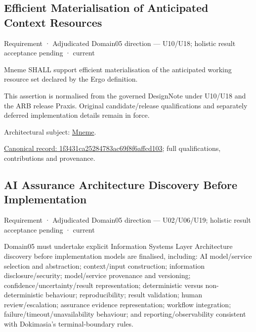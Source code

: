 \subsection{Efficient Materialisation of Anticipated Context Resources}

\label{element:1f3431ca25284783ac69f8f6affcd103}
{\small Requirement · Adjudicated Domain05 direction — U10/U18; holistic result acceptance pending · current}\par

Mneme SHALL support efficient materialisation of the anticipated working resource set declared by the Ergo definition.



This assertion is normalised from the governed DesignNote under U10/U18 and the ARB release Praxis. Original candidate/release qualifications and separately deferred implementation details remain in force.



Architectural subject: \hyperref[element:1af8a56358f7429fabfb57be66542a99]{Mneme}.


{\footnotesize \href{../../../../continuum/motivation/requirement/1f3431ca25284783ac69f8f6affcd103.md}{Canonical record: 1f3431ca25284783ac69f8f6affcd103}; full qualifications, contributions and provenance.}\par
\subsection{AI Assurance Architecture Discovery Before Implementation}

\label{element:24a609117a4f40839f8b669ebf720cde}
{\small Requirement · Adjudicated Domain05 direction — U02/U06/U19; holistic result acceptance pending · current}\par

Domain05 must undertake explicit Information Systems Layer Architecture discovery before implementation models are finalised, including: AI model/service selection and abstraction; context/input construction; information disclosure/security; model/service provenance and versioning; confidence/uncertainty/result representation; deterministic versus non-deterministic behaviour; reproducibility; result validation; human review/escalation; assurance evidence representation; workflow integration; failure/timeout/unavailability behaviour; and reporting/observability consistent with Dokimasia's terminal-boundary rules.



